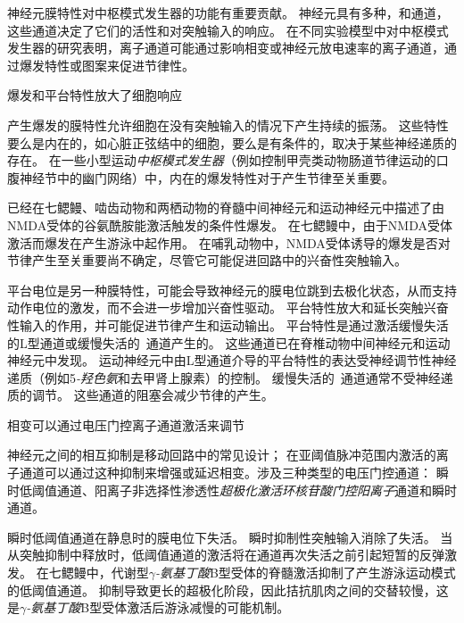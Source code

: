 \begin{proposition}[神经元离子通道有助于中枢模式发生器功能] \label{box:33_2}
	
	\quad \quad 神经元膜特性对中枢模式发生器的功能有重要贡献。
	神经元具有多种，和通道，这些通道决定了它们的活性和对突触输入的响应。
	在不同实验模型中对中枢模式发生器的研究表明，离子通道可能通过影响相变或神经元放电速率的离子通道，通过爆发特性或图案来促进节律性。
	
	\quad \quad \textcolor[HTML]{00A652}{爆发和平台特性放大了细胞响应}
	
	\quad \quad 产生爆发的膜特性允许细胞在没有突触输入的情况下产生持续的振荡。
	这些特性要么是内在的，如心脏正弦结中的细胞，要么是有条件的，取决于某些神经递质的存在。
	在一些小型运动\textit{中枢模式发生器}（例如控制甲壳类动物肠道节律运动的口腹神经节中的幽门网络）中，内在的爆发特性对于产生节律至关重要。
	
	\quad \quad 已经在七鳃鳗、啮齿动物和两栖动物的脊髓中间神经元和运动神经元中描述了由NMDA受体的谷氨酰胺能激活触发的条件性爆发。
	在七鳃鳗中，由于NMDA受体激活而爆发在产生游泳中起作用。
	在哺乳动物中，NMDA受体诱导的爆发是否对节律产生至关重要尚不确定，尽管它可能促进回路中的兴奋性突触输入。
	
	\quad \quad 平台电位是另一种膜特性，可能会导致神经元的膜电位跳到去极化状态，从而支持动作电位的激发，而不会进一步增加兴奋性驱动。
	平台特性放大和延长突触兴奋性输入的作用，并可能促进节律产生和运动输出。
	平台特性是通过激活缓慢失活的L型通道或缓慢失活的~通道产生的。
	这些通道已在脊椎动物中间神经元和运动神经元中发现。
	运动神经元中由L型通道介导的平台特性的表达受神经调节性神经递质（例如5\textit{-羟色氨}和去甲肾上腺素）的控制。
	缓慢失活的~通道通常不受神经递质的调节。
	这些通道的阻塞会减少节律的产生。
	
	\quad \quad \textcolor[HTML]{00A652}{相变可以通过电压门控离子通道激活来调节}
	
	\quad \quad 神经元之间的相互抑制是移动回路中的常见设计；
	在亚阈值脉冲范围内激活的离子通道可以通过这种抑制来增强或延迟相变。涉及三种类型的电压门控通道：
	瞬时低阈值通道、阳离子非选择性渗透性\textit{超极化激活环核苷酸门控阳离子}通道和瞬时通道。
	
	\quad \quad 瞬时低阈值通道在静息时的膜电位下失活。
	瞬时抑制性突触输入消除了失活。
	当从突触抑制中释放时，低阈值通道的激活将在通道再次失活之前引起短暂的反弹激发。
	在七鳃鳗中，代谢型\textit{$\gamma$-氨基丁酸}B型受体的脊髓激活抑制了产生游泳运动模式的低阈值通道。
	抑制导致更长的超极化阶段，因此拮抗肌肉之间的交替较慢，这是\textit{$\gamma$-氨基丁酸}B型受体激活后游泳减慢的可能机制。
	

\end{proposition}
